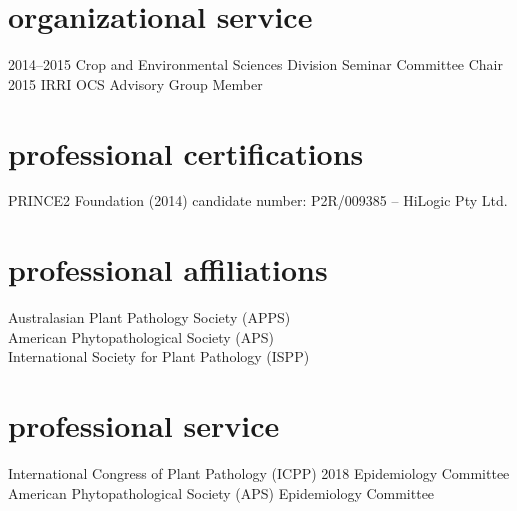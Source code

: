       \section*{organizational service}
        \begin{entrylist}
          \entry{}
          {2014--2015}
        	{Crop and Environmental Sciences Division Seminar Committee Chair}
        	{}
        	{}
	      \entry{}
        {2015}
        	{IRRI OCS Advisory Group Member}
        	{}
        	{}
        \end{entrylist}
        \section*{professional certifications}
        PRINCE2 Foundation (2014) candidate number: P2R/009385 – HiLogic Pty Ltd.

        \section*{professional affiliations}
        Australasian Plant Pathology Society (APPS)\\
        American Phytopathological Society (APS)\\
        International Society for Plant Pathology (ISPP)\\

        \section*{professional service}
        International Congress of Plant Pathology (ICPP) 2018 Epidemiology Committee\\
        American Phytopathological Society (APS) Epidemiology Committee\\
